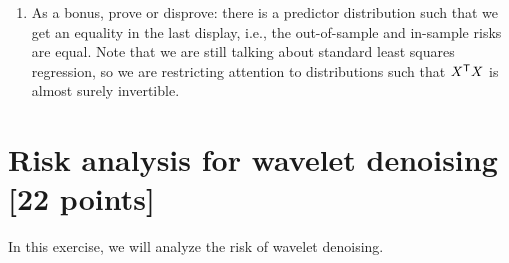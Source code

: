 \documentclass{article}
\begin{document}
\begin{enumerate}[label=(\alph*)]
\item As a bonus, prove or disprove: there is a predictor distribution such that
  we get an equality in the last display, i.e., the out-of-sample and in-sample
  risks are equal. Note that we are still talking about standard least squares
  regression, so we are restricting attention to distributions such that $X^{\mathsf{T}}
  X$ is almost surely invertible.  
\end{enumerate}

\section{Risk analysis for wavelet denoising [22 points]}

\def\ttheta{\tilde\theta}
\def\TV{\mathrm{TV}}

In this exercise, we will analyze the risk of wavelet denoising. 
\end{document}
